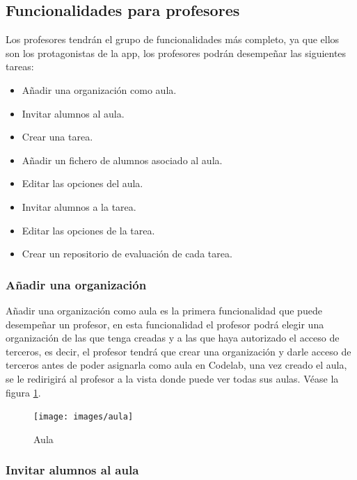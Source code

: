 \newpage

\subsection{Funcionalidades para profesores}
\label{3:6:2}

Los profesores tendrán el grupo de funcionalidades más completo, ya que ellos son los protagonistas de la app, los profesores podrán desempeñar las siguientes tareas:

\begin{itemize}
  \item Añadir una organización como aula.
  \item Invitar alumnos al aula.
  \item Crear una tarea.
  \item Añadir un fichero de alumnos asociado al aula.
  \item Editar las opciones del aula.
  \item Invitar alumnos a la tarea.
  \item Editar las opciones de la tarea.
  \item Crear un repositorio de evaluación de cada tarea.
\end{itemize}

\subsubsection{Añadir una organización}

Añadir una organización como aula es la primera funcionalidad que puede desempeñar un profesor, en esta funcionalidad el profesor podrá elegir una organización de las que tenga creadas y a las que haya autorizado el acceso de terceros, 
es decir, el profesor tendrá que crear una organización y darle acceso de terceros antes de poder asignarla como aula en Codelab, una vez creado el aula, se le redirigirá al profesor a la vista donde puede ver todas sus aulas.
Véase la figura \ref{fig:Aula}.

\begin{figure}[!th]
\begin{center}
\texttt{[image: images/aula]}
\caption{Aula}
\label{fig:Aula}
\end{center}
\end{figure}

\newpage
\subsubsection{Invitar alumnos al aula}

